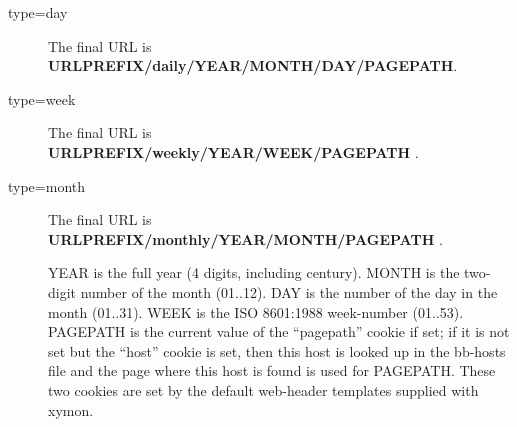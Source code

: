  \begin{description}
\item[type=day] The final URL is \textbf{URLPREFIX/daily/YEAR/MONTH/DAY/PAGEPATH}. 

 

\item[type=week] The final URL is \textbf{URLPREFIX/weekly/YEAR/WEEK/PAGEPATH}
. 

 

\item[type=month] The final URL is \textbf{URLPREFIX/monthly/YEAR/MONTH/PAGEPATH}
. 

  YEAR is the full year (4 digits, including century). MONTH is the
  two-digit number of the month (01..12). DAY is the number of the day
  in the month (01..31). WEEK is the ISO 8601:1988 week-number
  (01..53). PAGEPATH is the current value of the ``pagepath'' cookie
  if set; if it is not set but the ``host'' cookie is set, then this
  host is looked up in the bb-hosts file and the page where this host
  is found is used for PAGEPATH. These two cookies are set by the
  default web-header templates supplied with xymon. 



\end{description}


